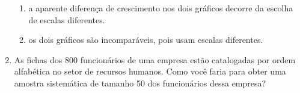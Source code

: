 \begin{enumerate}
\begin{enumerate}
\item {} 
a aparente diferença de crescimento nos dois gráficos decorre da escolha de escalas diferentes.

\item {} 
os dois gráficos são incomparáveis, pois usam escalas diferentes.

\end{enumerate}

\item As fichas dos 800 funcionários de uma empresa estão catalogadas por ordem alfabética no setor de recursos humanos. Como você faria para obter uma amostra sistemática de tamanho 50 dos funcionários dessa empresa?
\end{enumerate}